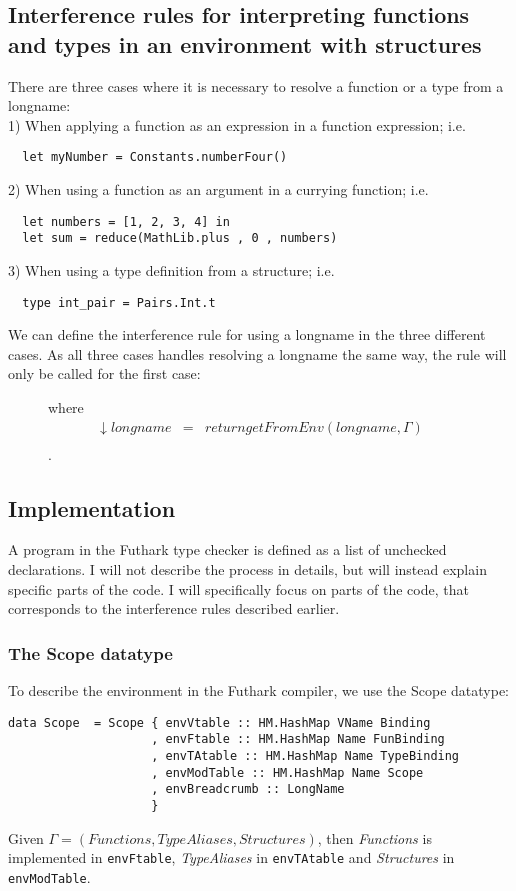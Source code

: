 \subsection{Interference rules for interpreting functions and types in an
  environment with structures}\label{interpretingfunctionsandtypeswithstructures}
There are three cases where it is necessary to resolve a function or a type from a
longname:\\
1) When applying a function as an expression in a function expression; i.e.
\begin{verbatim}
  let myNumber = Constants.numberFour()
\end{verbatim}
2) When using a function as an argument in a currying function; i.e.
\begin{verbatim}
  let numbers = [1, 2, 3, 4] in
  let sum = reduce(MathLib.plus , 0 , numbers)
\end{verbatim}
3) When using a type definition from a structure; i.e.
\begin{verbatim}
  type int_pair = Pairs.Int.t 
\end{verbatim}
We can define the interference rule for using a longname in the three different
cases. As all three cases handles resolving a longname the same way, the rule
will only be called for the first case:
\begin{figure}\label{Rule5}
  \begin{prooftree}
  \end{prooftree}
  where
  \begin{align*}
    \downarrow longname & = & return getFromEnv(longname , \Gamma) \\
  \end{align*}.
\end{figure}
\subsection{Implementation}
A program in the Futhark type checker is defined as a list of unchecked
declarations.
I will not describe the process in details, but will instead
explain specific parts of the code.
I will specifically focus on parts of the code, that corresponds to the
interference rules described earlier.
\\
\subsubsection{The Scope datatype}
To describe the environment in the Futhark compiler, we use the Scope datatype:
\begin{verbatim}
data Scope  = Scope { envVtable :: HM.HashMap VName Binding
                    , envFtable :: HM.HashMap Name FunBinding
                    , envTAtable :: HM.HashMap Name TypeBinding
                    , envModTable :: HM.HashMap Name Scope
                    , envBreadcrumb :: LongName
                    }
\end{verbatim}
Given $\Gamma = (Functions, TypeAliases, Structures)$, then \textit{Functions} is
implemented in \texttt{envFtable}, \textit{TypeAliases} in \texttt{envTAtable} and \textit{Structures} in \texttt{envModTable}.
